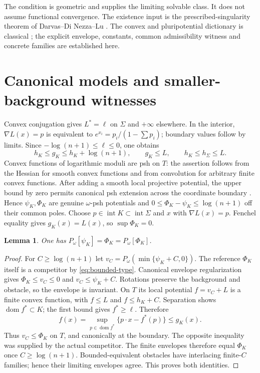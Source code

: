 \documentclass[11pt]{article}
\newtheorem{lemma}[theorem]{Lemma}
\begin{document}
The condition is geometric and supplies the limiting solvable class.
It does not assume functional convergence. The existence input is the
prescribed-singularity theorem of Darvas--Di Nezza--Lu
\cite[Theorem A(i); Theorems 4.3 and 4.7]{DDL}.
The convex and pluripotential dictionary is classical
\cite[Sections 2.1--2.3]{BB}\cite[Section 7]{DDL}; the explicit envelope, constants, common
admissibility witness and concrete families are established here.

\section{Canonical models and smaller-background witnesses}

Convex conjugation gives $L^*=\ell$ on $\Sigma$ and $+\infty$ elsewhere.
In the interior, $\nabla L(x)=p$ is equivalent to
$e^{x_i}=p_i/(1-\sum p_i)$; boundary values follow by limits. Since
$-\log(n+1)\le\ell\le0$, one obtains
\begin{equation}\label{eq:bounded-type}
 h_K\le g_K\le h_K+\log(n+1),\qquad g_K\le L,
 \qquad h_K\le h_\Sigma\le L.
\end{equation}
Convex functions of logarithmic moduli are psh on $T$: the assertion
follows from the Hessian for smooth convex functions and from convolution
for arbitrary finite convex functions. After adding a smooth local
projective potential, the upper bound by zero permits canonical psh
extension across the coordinate boundary
\cite[I.5.23--5.24]{Demailly}. Hence $\psi_K,\Phi_K$ are genuine
$\omega$-psh potentials and
$0\le\Phi_K-\psi_K\le\log(n+1)$ off their common poles.
Choose $p\in\operatorname{int}K\subset\operatorname{int}\Sigma$ and
$x$ with $\nabla L(x)=p$. Fenchel equality gives $g_K(x)=L(x)$, so
$\sup\Phi_K=0$.

\begin{lemma}\label{lem:model}
One has $P_\omega[\psi_K]=\Phi_K=P_\omega[\Phi_K]$.
\end{lemma}
\begin{proof}
For $C\ge\log(n+1)$ let
$v_C=P_\omega(\min\{\psi_K+C,0\})$. The reference $\Phi_K$ itself is
a competitor by \eqref{eq:bounded-type}. Canonical envelope regularization
\cite[I.5.7]{Demailly} gives $\Phi_K\le v_C\le0$ and
$v_C\le\psi_K+C$. Rotations preserve the background and obstacle,
so the envelope is invariant. On $T$ its local potential $f=v_C+L$ is
a finite convex function, with $f\le L$ and $f\le h_K+C$.
Separation shows $\operatorname{dom}f^*\subset K$; the first bound gives
$f^*\ge\ell$. Therefore
\[
 f(x)=\sup_{p\in\operatorname{dom}f^*}\{p\cdot x-f^*(p)\}
       \le g_K(x).
\]
Thus $v_C\le\Phi_K$ on $T$, and canonically at the boundary.
The opposite inequality was supplied by the actual competitor.
The finite envelopes therefore equal $\Phi_K$ once $C\ge\log(n+1)$.
Bounded-equivalent obstacles have interlacing finite-$C$ families;
hence their limiting envelopes agree. This proves both identities.
\end{proof}
\end{document}
